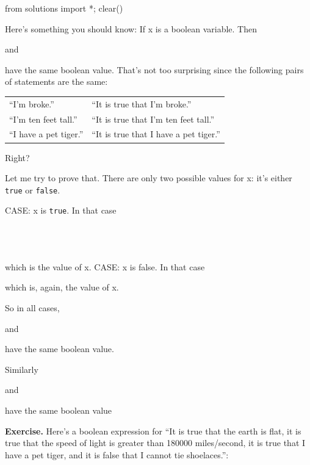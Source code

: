 \begin{python0}
from solutions import *; clear()
\end{python0}

Here's something you should know: If x is a boolean variable. Then


and


have the same boolean value. That's not too surprising since the
following pairs of statements are the same:

\begin{tabular}{p{5cm} p{7cm}}
“I'm broke.” & “It is true that I'm broke.”\\
“I'm ten feet tall.” & “It is true that I'm ten feet tall.”\\
“I have a pet tiger.” & “It is true that I have a pet tiger.”\\
\end{tabular}

Right?

Let me try to prove that. There are only two possible values for x: it's
either \verb!true! or \verb!false!.

CASE: x is \verb!true!. In that case

\\
\\
\\

which is the value of x.
CASE: x is false. In that case


which is, again, the value of x.

So in all cases,


and


have the same boolean value.

Similarly


and


have the same boolean value

\textbf{Exercise.} Here's a boolean expression for “It is true that the earth is flat, it is true that the speed of light is greater than 180000 miles/second, it is true that I have a pet tiger, and it is false that I cannot tie shoelaces.”:



